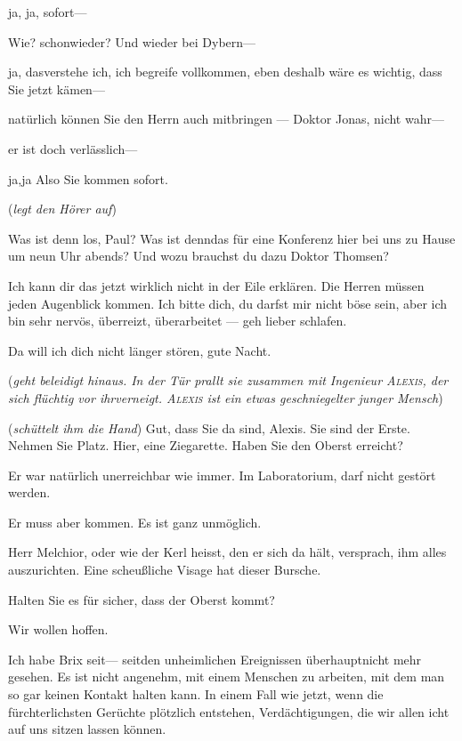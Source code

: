 \documentclass[
	final,
	a4paper,
	ngerman,
	mpinclude = true, %
	twoside = true,
	open = right,
	cleardoublepage = plain,
	DIV = 13,
	BCOR = 1cm,
	titlepage = firstiscover,
	]{scrbook}
\newcommand{\direction}[1]{(\textit{#1})}
\newcommand{\thecharacter}[1]{\textup{\textsc{#1}}\xspace}
\newcommand{\theClarisse}{\thecharacter{Clarisse}}
\newcommand{\theAlexis}{\thecharacter{Alexis}}
\newcommand{\character}[1]{\item[#1]}
\newcommand{\Generaldirektor}{\character{Direktor}}
\newcommand{\Clarisse}{\character{\theClarisse}}
\newcommand{\Alexis}{\character{\theAlexis}}
\begin{document}
\begin{play}
ja, ja, sofort---

Wie? schonwieder? Und wieder bei Dybern---

ja, dasverstehe ich, ich begreife vollkommen, eben deshalb wäre es wichtig, dass Sie jetzt kämen---

natürlich können Sie den Herrn auch mitbringen --- Doktor Jonas, nicht wahr---

er ist doch verlässlich---

ja,ja Also Sie kommen sofort.

\direction{legt den Hörer auf}

\Clarisse
Was ist denn los, Paul? Was ist denndas für eine Konferenz hier bei uns zu Hause um neun Uhr abends? Und wozu brauchst du dazu Doktor Thomsen?

\Generaldirektor
Ich kann dir das jetzt wirklich nicht in der Eile erklären. Die Herren müssen jeden Augenblick kommen. Ich bitte dich, du darfst mir nicht böse sein, aber ich bin sehr nervös, überreizt, überarbeitet --- geh lieber schlafen.

\Clarisse
Da will ich dich nicht länger stören, gute Nacht.

\direction{geht beleidigt hinaus. In der Tür prallt sie zusammen mit Ingenieur \theAlexis, der sich flüchtig vor ihrverneigt. \theAlexis ist ein etwas geschniegelter junger Mensch}

\Generaldirektor
\direction{schüttelt ihm die Hand} Gut, dass Sie da sind, Alexis. Sie sind der Erste. Nehmen Sie Platz. Hier, eine Ziegarette. Haben Sie den Oberst erreicht?

\Alexis
Er war natürlich unerreichbar wie immer. Im Laboratorium, darf nicht gestört werden.

\Generaldirektor
Er muss aber kommen. Es ist ganz unmöglich.

\Alexis
Herr Melchior, oder wie der Kerl heisst, den er sich da hält, versprach, ihm alles auszurichten. Eine scheußliche Visage hat dieser Bursche.

\Generaldirektor
Halten Sie es für sicher, dass der Oberst kommt?

\Alexis
Wir wollen hoffen.

\Generaldirektor
Ich habe Brix seit--- seitden unheimlichen Ereignissen überhauptnicht mehr gesehen. Es ist nicht angenehm, mit einem Menschen zu arbeiten, mit dem man so gar keinen Kontakt halten kann. In einem Fall wie jetzt, wenn die fürchterlichsten Gerüchte plötzlich entstehen, Verdächtigungen, die wir allen icht auf uns sitzen lassen können.


\end{play}
\end{document}
